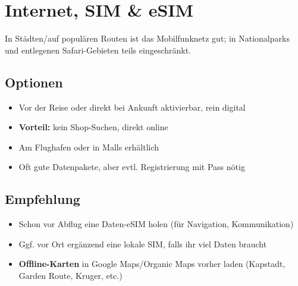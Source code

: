\documentclass[12pt,a4paper]{article}
\begin{document}
\newpage
\section{Internet, SIM \& eSIM}

In Städten/auf populären Routen ist das Mobilfunknetz gut; in Nationalparks und entlegenen Safari-Gebieten teils eingeschränkt.

\subsection{Optionen}

\begin{infobox}[title={\faWifi \hspace{0.2cm} eSIM-Anbieter (z.B. Airalo \& Co.)}]
\begin{itemize}[leftmargin=*,label={\color{mainblue}\faCheckCircle}]
    \item Vor der Reise oder direkt bei Ankunft aktivierbar, rein digital
    \item \textbf{Vorteil:} kein Shop-Suchen, direkt online\cite{airalo}
\end{itemize}
\end{infobox}

\vspace{0.3cm}

\begin{actionbox}[title={\faSimCard \hspace{0.2cm} Lokale SIM/eSIM (z.B. Vodacom, MTN, Telkom)}]
\begin{itemize}[leftmargin=*,label={\color{accentorange}\faCheckCircle}]
    \item Am Flughafen oder in Malls erhältlich
    \item Oft gute Datenpakete, aber evtl. Registrierung mit Pass nötig
\end{itemize}
\end{actionbox}

\subsection{Empfehlung}

\begin{itemize}[leftmargin=*,label={\color{darkgreen}\faArrowRight}]
    \item Schon vor Abflug eine Daten-eSIM holen (für Navigation, Kommunikation)
    \item Ggf. vor Ort ergänzend eine lokale SIM, falls ihr viel Daten braucht
    \item \textbf{Offline-Karten} in Google Maps/Organic Maps vorher laden (Kapstadt, Garden Route, Kruger, etc.)
\end{itemize}
\end{document}

